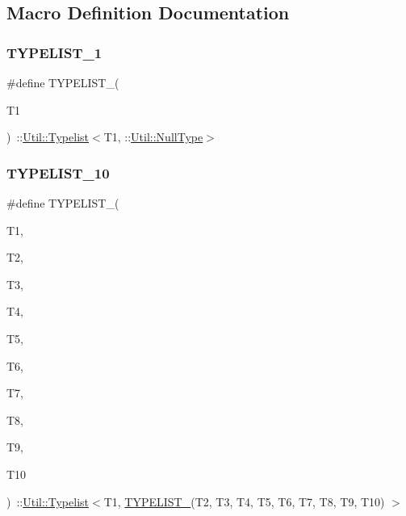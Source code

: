 \subsection{Macro Definition Documentation}
\mbox{\label{adat-devel_2lib_2adat_2typelist_8h_a6a7a6aa3dece450c8d239713e2952df7}} 
\subsubsection{\texorpdfstring{TYPELIST\_1}{TYPELIST\_1}}
{\footnotesize\ttfamily \#define T\+Y\+P\+E\+L\+I\+S\+T\+\_(\begin{DoxyParamCaption}\item[{}]{T1 }\end{DoxyParamCaption})~\+::\mbox{\hyperlink{structUtil_1_1Typelist}{Util\+::\+Typelist}}$<$T1, \+::\mbox{\hyperlink{classUtil_1_1NullType}{Util\+::\+Null\+Type}}$>$}

\mbox{\label{adat-devel_2lib_2adat_2typelist_8h_ab1b1b381fea18c4c22a2484f0d5c04a2}} 
\subsubsection{\texorpdfstring{TYPELIST\_10}{TYPELIST\_10}}
{\footnotesize\ttfamily \#define T\+Y\+P\+E\+L\+I\+S\+T\+\_(\begin{DoxyParamCaption}\item[{}]{T1,  }\item[{}]{T2,  }\item[{}]{T3,  }\item[{}]{T4,  }\item[{}]{T5,  }\item[{}]{T6,  }\item[{}]{T7,  }\item[{}]{T8,  }\item[{}]{T9,  }\item[{}]{T10 }\end{DoxyParamCaption})~\+::\mbox{\hyperlink{structUtil_1_1Typelist}{Util\+::\+Typelist}}$<$T1, \mbox{\hyperlink{adat__devel__install_2include_2adat_2typelist_8h_ac938e9eedc71479614ff131e99f58f38}{T\+Y\+P\+E\+L\+I\+S\+T\+\_}}(T2, T3, T4, T5, T6, T7, T8, T9, T10) $>$}

